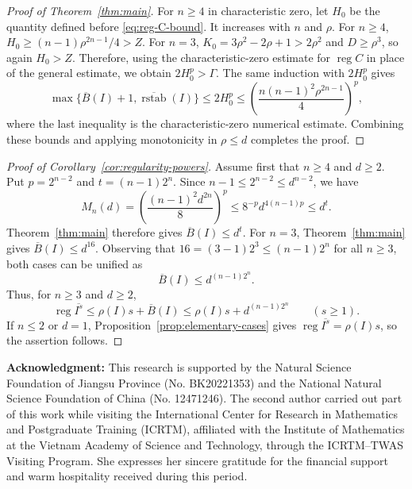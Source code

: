 \documentclass[12pt]{amsart}
\numberwithin{equation}{section}
\theoremstyle{definition}
\theoremstyle{remark}
\numberwithin{equation}{section}
\DeclareMathOperator{\reg}{reg}
\newcommand{\Bn}{\overline B}
\newcommand{\rstabn}{\overline{\operatorname{rstab}}}
\begin{document}
\begin{proof}[Proof of Theorem~\ref{thm:main}]
		For $n\ge4$ in characteristic zero, let $H_0$ be the quantity  defined before \eqref{eq:reg-C-bound}.  It increases with $n$ and $\rho$.
	For $n\ge4$, $H_0\ge(n-1)\rho^{2n-1}/4>Z$. For $n=3$, $K_0=3\rho^2-2\rho+1>2\rho^2$ and $D\ge\rho^3$, so again
	$H_0>Z$.
	Therefore, using the characteristic-zero estimate for $\reg C$ in place of the general estimate, we obtain $2H_0^p>\Gamma$.
	The same induction with $2H_0^p$ gives
	\[
	\max\{\Bn(I)+1,\rstabn(I)\}\le2H_0^p
	\le\left(\frac{n(n-1)^2\rho^{2n-1}}4\right)^p,
	\]
	where the last inequality is the characteristic-zero numerical estimate. Combining these bounds and applying monotonicity in $\rho\le d$ completes the proof.
	\end{proof}

\begin{proof}[Proof of Corollary~\ref{cor:regularity-powers}]
	Assume first that $n\ge4$ and $d\ge2$. Put $p=2^{n-2}$ and	$t=(n-1)2^n$. Since $n-1\le2^{n-2}\le d^{n-2}$, we have
	\[
	M_n(d)=\left(\frac{(n-1)^2d^{2n}}8\right)^p
	\le8^{-p}d^{4(n-1)p}\le d^t.
	\]
	Theorem~\ref{thm:main} therefore gives $\Bn(I)\le d^t$.	For $n=3$, Theorem~\ref{thm:main} gives $\Bn(I)\le d^{16}$.
Observing that $16=(3-1)2^3 \le (n-1)2^n$ for all $n\ge3$, both cases can be unified as
	\[
\Bn(I)\le d^{(n-1)2^n}.
	\]
	Thus, for $n\ge3$ and $d\ge2$,
	\[
	\reg\overline{I^s}\le\rho(I)s+\Bn(I)
	\le \rho(I)s+d^{(n-1)2^n}\qquad(s\ge1).
	\]
	If $n\le2$ or $d=1$, Proposition~\ref{prop:elementary-cases} gives $\reg\overline{I^s}=\rho(I)s$, so the assertion follows.
\end{proof}

\hspace{-6mm} {\bf Acknowledgment: }
This research is supported by the Natural Science Foundation of Jiangsu Province (No.  BK20221353) and the National Natural Science Foundation of China (No. 12471246).  The second author carried out part of this work while visiting the International Center for Research in Mathematics and Postgraduate Training (ICRTM), affiliated with the Institute of Mathematics at the Vietnam Academy of Science and Technology, through the ICRTM--TWAS Visiting Program. She expresses her sincere gratitude for the financial support and warm hospitality received during this period.
\end{document}
